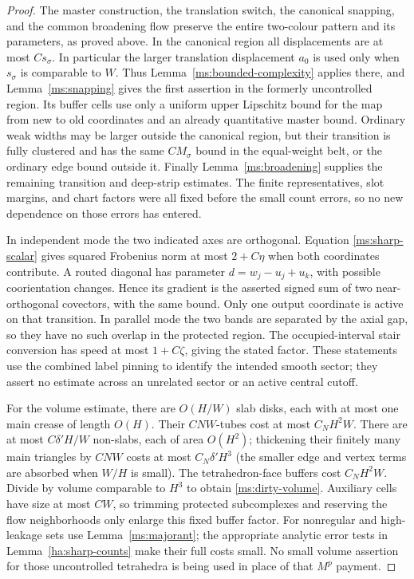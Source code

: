 \begin{proof}
The master construction, the translation switch, the canonical
snapping, and the common broadening flow preserve the entire
two-colour pattern and its parameters, as proved above.  In the
canonical region all displacements are at most $Cs_\sigma$.
In particular the larger translation displacement $a_0$ is used
only when $s_\sigma$ is comparable to $W$.  Thus
Lemma~\ref{ms:bounded-complexity} applies there, and
Lemma~\ref{ms:snapping} gives the first assertion in the formerly
uncontrolled region.  Its buffer cells use only a uniform upper
Lipschitz bound for the map from new to old coordinates and an
already quantitative master bound.  Ordinary weak widths may
be larger outside the canonical region, but their transition is
fully clustered and has the same $CM_\sigma$ bound in the
equal-weight belt, or the ordinary edge bound outside it.
Finally Lemma~\ref{ms:broadening} supplies the remaining transition and
deep-strip estimates.  The finite representatives, slot margins,
and chart factors were all fixed before the small count errors,
so no new dependence on those errors has entered.

In independent mode the two indicated axes are orthogonal.
Equation \eqref{ms:sharp-scalar} gives squared Frobenius norm at
most $2+C\eta$ when both coordinates contribute.  A routed
diagonal has parameter $d=w_j-u_j+u_k$, with possible
coorientation changes.  Hence its gradient is the asserted
signed sum of two near-orthogonal covectors, with the same bound.
Only one output coordinate is active on that transition.  In
parallel mode the two bands are separated by the axial gap, so
they have no such overlap in the protected region.  The
occupied-interval stair conversion has speed at most
$1+C\zeta$, giving the stated factor.  These statements use the
combined label pinning to identify the intended smooth sector;
they assert no estimate across an unrelated sector or an active
central cutoff.

For the volume estimate, there are $O(H/W)$ slab disks, each
with at most one main crease of length $O(H)$.  Their
$CNW$-tubes cost at most $C_NH^2W$.  There are at most
$C\delta'H/W$ non-slabs, each of area $O(H^2)$; thickening
their finitely many main triangles by $CNW$ costs at most
$C_N\delta'H^3$ (the smaller edge and vertex terms are absorbed
when $W/H$ is small).  The tetrahedron-face buffers cost
$C_NH^2W$.  Divide by volume comparable to $H^3$ to obtain
\eqref{ms:dirty-volume}.  Auxiliary cells have size at most
$CW$, so trimming protected subcomplexes and reserving the
flow neighborhoods only enlarge this fixed buffer factor.
For nonregular and high-leakage sets use
Lemma~\ref{ms:majorant}; the appropriate analytic error tests in
Lemma~\ref{ha:sharp-counts} make their full costs small.  No small
volume assertion for those uncontrolled tetrahedra is being
used in place of that $M^p$ payment.
\end{proof}

